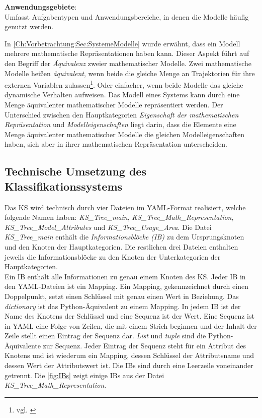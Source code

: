 \textbf{Anwendungsgebiete}: \\
Umfasst Aufgabentypen und Anwendungsbereiche, in denen die Modelle häufig genutzt werden.

In \autoref{Ch:Vorbetrachtung:Sec:SystemeModelle} wurde erwähnt, dass ein Modell mehrere mathematische Repräsentationen haben kann. Dieser Aspekt führt auf den Begriff der \textit{Äquivalenz} zweier mathematischer Modelle. Zwei mathematische Modelle heißen \textit{äquivalent}, wenn beide die gleiche Menge an Trajektorien für ihre externen Variablen zulassen\footnote{vgl. \cite[S. 34]{SCH89}}. Oder einfacher, wenn beide Modelle das gleiche dynamische Verhalten aufweisen. Das Modell eines Systems kann durch eine Menge äquivalenter mathematischer Modelle repräsentiert werden. Der Unterschied zwischen den Hauptkategorien \textit{Eigenschaft der mathematischen Repräsentation} und \textit{Modelleigenschaften} liegt darin, dass die Elemente eine Menge äquivalenter mathematischer Modelle die gleichen Modelleigenschaften haben, sich aber in ihrer mathematischen Repräsentation unterscheiden.

\subsection{Technische Umsetzung des Klassifikationssystems}
\label{Ch:Ergebnisse:Sec:KS:SubSec:TechUmsetzung}
Das KS wird technisch durch vier Dateien im YAML-Format realisiert, welche folgende Namen haben: \textit{KS\_Tree\_main}, \textit{KS\_Tree\_Math\_Representation}, \textit{KS\_Tree\_Model\_Attributes} und \textit{KS\_Tree\_Usage\_Area}. Die Datei \textit{KS\_Tree\_main} enthält die \textit{Informationsblöcke (IB)} zu dem Ursprungsknoten und den Knoten der Hauptkategorien. Die restlichen drei Dateien enthalten jeweils die Informationsblöcke zu den Knoten der Unterkategorien der Hauptkategorien. \\ 
Ein IB enthält alle Informationen zu genau einem Knoten des KS. Jeder IB in den YAML-Dateien ist ein Mapping. Ein Mapping, gekennzeichnet durch einen Doppelpunkt, setzt einen Schlüssel mit genau einen Wert in Beziehung. Das \textit{dictionary} ist das Python-Äquivalent zu einem Mapping. In jedem IB ist der Name des Knotens der Schlüssel und eine Sequenz ist der Wert. Eine Sequenz ist in YAML eine Folge von Zeilen, die mit einem Strich beginnen und der Inhalt der Zeile stellt einen Eintrag der Sequenz dar. \textit{List} und \textit{tuple} sind die Python-Äquivalente zur Sequenz. Jeder Eintrag der Sequenz steht für ein Attribut des Knotens und ist wiederum ein Mapping, dessen Schlüssel der Attributsname und dessen Wert der Attributswert ist. Die IB\grq s sind durch eine Leerzeile voneinander getrennt. Die \autoref{fig:IBs} zeigt einige IB\grq s aus der Datei \textit{KS\_Tree\_Math\_Representation}.

